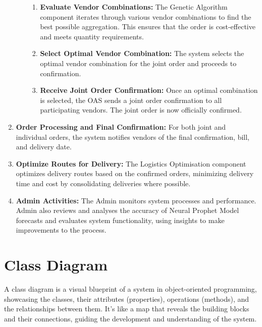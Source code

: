 \begin{enumerate}
\begin{itemize}
\begin{enumerate}
                        \item \textbf{Evaluate Vendor Combinations:} The Genetic Algorithm component iterates through various vendor combinations to find the best possible aggregation. This ensures that the order is cost-effective and meets quantity requirements.
                        \item \textbf{Select Optimal Vendor Combination:} The system selects the optimal vendor combination for the joint order and proceeds to confirmation.
                        \item \textbf{Receive Joint Order Confirmation:} Once an optimal combination is selected, the OAS sends a joint order confirmation to all participating vendors. The joint order is now officially confirmed.
                    \end{enumerate}
          \end{itemize}
    \item \textbf{Order Processing and Final Confirmation:} For both joint and individual orders, the system notifies vendors of the final confirmation, bill, and delivery date.
    \item \textbf{Optimize Routes for Delivery:} The Logistics Optimisation component optimizes delivery routes based on the confirmed orders, minimizing delivery time and cost by consolidating deliveries where possible.
    \item \textbf{Admin Activities:} The Admin monitors system processes and performance. Admin also reviews and analyses the accuracy of Neural Prophet Model forecasts and evaluates system functionality, using insights to make improvements to the process.
\end{enumerate}
\section{Class Diagram}

A class diagram is a visual blueprint of a system in object-oriented programming, showcasing the classes, their attributes (properties), operations (methods), and the relationships between them. It’s like a map that reveals the building blocks and their connections, guiding the development and understanding of the system.

